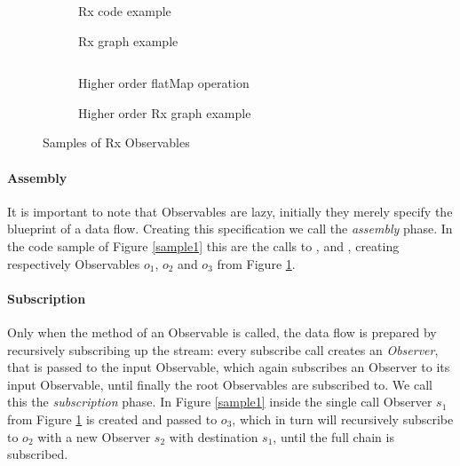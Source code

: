 \begin{figure*}[h!]
\centering

\begin{subfigure}[t]{\columnwidth}
	\inputminted[tabsize=2]{javascript}{listings/sample1.js}	
	\par\bigskip
	\caption{Rx code example}
	\label{sample1}
	\par\medskip
	
	\caption{Rx graph example}
	\label{chaincreate}
\end{subfigure}
\begin{subfigure}[t]{\columnwidth}
	\inputminted[tabsize=2]{javascript}{listings/sample3.js}	
	\caption{Higher order flatMap operation}
	\label{sample3}
	\par\medskip
	
	\caption{Higher order Rx graph example}
	\label{chainhigher}
\end{subfigure}

\caption{Samples of Rx Observables}

\end{figure*}

\paragraph{Assembly} It is important to note that Observables are lazy, initially they merely specify the blueprint of a data flow. 
Creating this specification we call the \textit{assembly} phase. In the code sample of Figure \ref{sample1} this are the calls to ,  and , creating respectively Observables $o_1$, $o_2$ and $o_3$ from Figure \ref{chaincreate}.

\paragraph{Subscription} Only when the  method of an Observable is called, the data flow is prepared by recursively subscribing up the stream: every subscribe call creates an \textit{Observer}, that is passed to the input Observable, which again subscribes an Observer to its input Observable, until finally the root Observables are subscribed to. We call this the \textit{subscription} phase. In Figure \ref{sample1} inside the single  call Observer $s_1$ from Figure \ref{chaincreate} is created and passed to $o_3$, which in turn will recursively subscribe to $o_2$ with a new Observer $s_2$ with destination $s_1$, until the full chain is subscribed.

